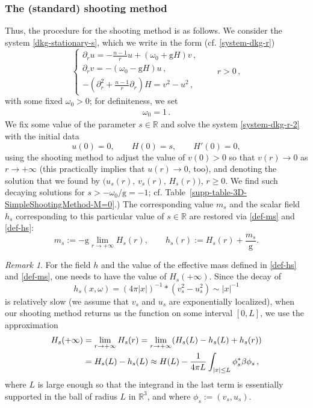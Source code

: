 \documentclass[12pt]{extarticle}
\newcommand{\coupling}{\mathrm{g}}
\newcommand{\p}{\partial}
\def\R{\mathbb{R}}
\newcommand{\abs}[1]{\vert #1 \vert}
\theoremstyle{plain}
\theoremstyle{remark}
\newtheorem{remark}[lemma]{Remark}
\begin{document}
\subsubsection*{The (standard) shooting method}

Thus, the procedure for the shooting method
is as follows.
We consider the system
\eqref{dkg-stationary-s},
which we write in the form
(cf. \eqref{system-dkg-r})
\begin{equation}\label{system-dkg-r-2}
\begin{cases}
  \p_r u
  =
  -\frac{n-1}{r}u+(\omega_0+\coupling H)v\,,
  \\
  \p_r v=
  -(\omega_0-\coupling H)u\,,
  \\
  -\left(
  \p_r^2+\frac{n-1}{r}\p_r
  \right)H=v^2-u^2\,,
\end{cases}
\qquad
r>0\,,
\end{equation}
with some fixed $\omega_0>0$;
for definiteness, we set
\begin{align}\label{omega-is-1}
\omega_0=1\,.
\end{align}
We fix some value of the parameter $s\in\R$
and solve the system
\eqref{system-dkg-r-2}
with the initial data
\[
u(0)=0,
\qquad
H(0)=s,
\qquad
H'(0)=0,
\]
using the shooting method
to adjust the value of $v(0)>0$
so that $v(r)\to 0$
as $r\to+\infty$
(this practically
implies that $u(r)\to 0$, too),
and denoting the solution that
we found by
$\big(u_s(r),\,v_s(r),\,H_s(r)\big)$,
$r\ge 0$.
We find such
decaying solutions for
$s>-\omega_0/\coupling=-1$;
cf. Table~\ref{supp-table-3D-SimpleShootingMethod-M=0}.)
The corresponding value $m_s$
and the scalar field $h_s$
corresponding to this particular value of
$s\in\R$
are restored via \eqref{def-ms}
and \eqref{def-hs}:
\[
m_s
:=-\coupling\lim_{r\to+\infty}H_s(r),
\qquad
h_s(r)
:=H_s(r)+\frac{m_s}{\coupling}.
\]

\begin{remark}
\label{remark-41}
For the field $h$ and
the value
of the effective mass
defined in \eqref{def-hs}
and \eqref{def-ms},
one needs to have the value of 
$H_s(+\infty)$.
Since the decay of
\[
h_s(x,\omega)=(4\pi\abs{x})^{-1}\ast(v_s^2-u_s^2)
\sim \abs{x}^{-1}
\]
is relatively slow
(we assume that $v_s$ and $u_s$
are exponentially localized),
when our shooting method returns us
the function on some interval
$[0,L]$,
we use the approximation
\begin{align*}
H_s(+\infty)
&=\lim\sb{r\to+\infty}H_s(r)
=\lim\sb{r\to+\infty}
(H_s(L)-h_s(L)+h_s(r))
\\
&=H_s(L)-h_s(L)
    \approx
    H(L)-\frac{1}{4\pi L}
    \int_{\abs{x}\le L}
    \phi_s^*\beta\phi_s\,,
\end{align*}
where $L$
is large enough so that
the integrand
in the last term
is essentially supported
in the ball
of radius $L$
in $\R^3$, and where $\phi_s:=(v_s, u_s)$.
\end{remark}
\end{document}
